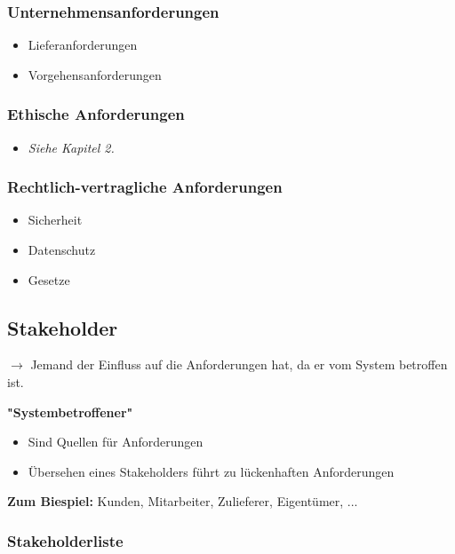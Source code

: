 \documentclass[11pt, a4paper]{article}
\begin{document}
\subsubsection*{Unternehmensanforderungen}
\begin{itemize}
    \item Lieferanforderungen
    \item Vorgehensanforderungen
\end{itemize}

\subsubsection*{Ethische Anforderungen}
\begin{itemize}
    \item \textit{Siehe Kapitel 2.}
\end{itemize}

\subsubsection*{Rechtlich-vertragliche Anforderungen}
\begin{itemize}
    \item Sicherheit
    \item Datenschutz
    \item Gesetze
\end{itemize}

\newpage


\subsection{Stakeholder}

$ \rightarrow $ Jemand der Einfluss auf die Anforderungen hat, da er vom System betroffen ist.

\textbf{"Systembetroffener"}

\begin{itemize}
    \item Sind Quellen für Anforderungen
    \item Übersehen eines Stakeholders führt zu lückenhaften Anforderungen
\end{itemize}

\textbf{Zum Biespiel:} Kunden, Mitarbeiter, Zulieferer, Eigentümer, ...

\subsubsection{Stakeholderliste}
\end{document}
